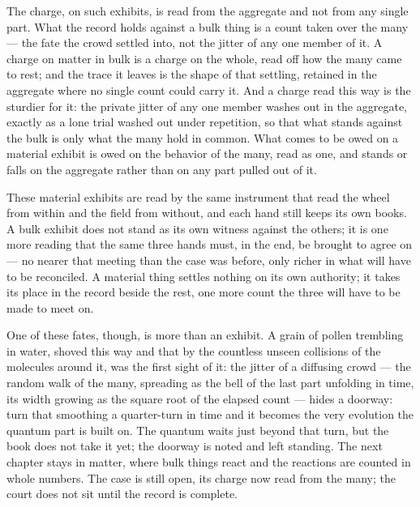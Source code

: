 The charge, on such exhibits, is read from the aggregate and not from any single part. What the record holds
against a bulk thing is a count taken over the many --- the fate the crowd settled into, not the jitter of any
one member of it. A charge on matter in bulk is a charge on the whole, read off how the many came to rest; and
the trace it leaves is the shape of that settling, retained in the aggregate where no single count could carry
it. And a charge read this way is the sturdier for it: the private jitter of any one member washes out in the
aggregate, exactly as a lone trial washed out under repetition, so that what stands against the bulk is only
what the many hold in common. What comes to be owed on a material exhibit is owed on the behavior of the many,
read as one, and stands or falls on the aggregate rather than on any part pulled out of it.

These material exhibits are read by the same instrument that read the wheel from within and the field from
without, and each hand still keeps its own books. A bulk exhibit does not stand as its own witness against the
others; it is one more reading that the same three hands must, in the end, be brought to agree on --- no nearer
that meeting than the case was before, only richer in what will have to be reconciled. A material thing settles
nothing on its own authority; it takes its place in the record beside the rest, one more count the three will
have to be made to meet on.

One of these fates, though, is more than an exhibit. A grain of pollen trembling in water, shoved this way and
that by the countless unseen collisions of the molecules around it, was the first sight of it: the jitter of a
diffusing crowd --- the random walk of the many, spreading as the bell of the last part unfolding in time, its
width growing as the square root of the elapsed count --- hides a doorway: turn that smoothing a quarter-turn in time and it becomes the very evolution
the quantum part is built on. The quantum waits just beyond that turn, but the book does not take
it yet; the doorway is noted and left standing. The next chapter stays in matter, where bulk things react and
the reactions are counted in whole numbers. The case is still open, its charge now read from the many; the court
does not sit until the record is complete.

